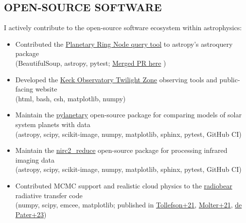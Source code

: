 \documentclass[margin, 10pt]{res} %
\newcommand\tab[1][1cm]{\hspace*{#1}}
\begin{document}
\begin{resume}

\section{OPEN-SOURCE SOFTWARE}

I actively contribute to the open-source software ecosystem within astrophysics:

\begin{itemize}
	

\item Contributed the \href{https://astroquery.readthedocs.io/en/latest/solarsystem/pds/pds.html}{Planetary Ring Node query tool} to astropy's astroquery package \\ 
\tab (BeautifulSoup, astropy, pytest; \href{https://github.com/astropy/astroquery/pull/2358}{Merged PR here} )

\item Developed the \href{https://www2.keck.hawaii.edu/inst/tda/TwilightZone.html#}{Keck Observatory Twilight Zone} observing tools and public-facing website \\ 
\tab (html, bash, csh, matplotlib, numpy)

\item Maintain the \href{https://github.com/emolter/pylanetary}{pylanetary} open-source package for comparing models of solar system planets with data \\
\tab (astropy, scipy, scikit-image, numpy, matplotlib, sphinx, pytest, GitHub CI)

\item Maintain the \href{https://github.com/emolter/nirc2_reduce}{nirc2\_reduce} open-source package for processing infrared imaging data \\
\tab (astropy, scipy, scikit-image, numpy, matplotlib, sphinx, pytest, GitHub CI)

\item Contributed MCMC support and realistic cloud physics to the \href{https://github.com/david-deboer/radiobear}{radiobear} radiative transfer code \\
\tab (numpy, scipy, emcee, matplotlib; published in \href{https://doi.org/10.3847/PSJ/abf837}{Tollefson+21}, \href{https://doi.org/10.3847/PSJ/abc48a}{Molter+21}, \href{https://doi.org/10.3390/rs15051313}{de Pater+23})


\end{itemize}
\end{resume}
\end{document}
